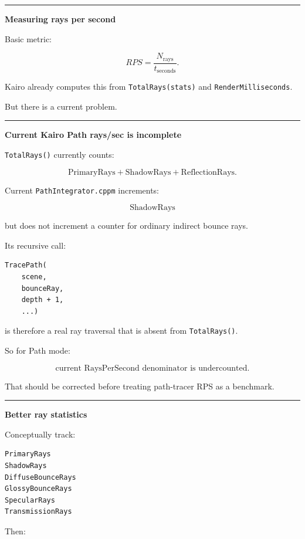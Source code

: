 \begin{center}\rule{0.5\linewidth}{0.5pt}\end{center}

\textbf{Measuring rays per second}

Basic metric:

\[
\boxed{
RPS
=
\frac{
N_{\text{rays}}
}{
t_{\text{seconds}}
}.
}
\]

Kairo already computes this from \texttt{TotalRays(stats)} and \texttt{RenderMilliseconds}.

But there is a current problem.

\begin{center}\rule{0.5\linewidth}{0.5pt}\end{center}

\textbf{Current Kairo Path rays/sec is incomplete}

\texttt{TotalRays()} currently counts:

\[
\text{PrimaryRays}
+
\text{ShadowRays}
+
\text{ReflectionRays}.
\]

Current \texttt{PathIntegrator.cppm} increments:

\[
\text{ShadowRays}
\]

but does not increment a counter for ordinary indirect bounce rays.

Its recursive call:

\begin{verbatim}
TracePath(
    scene,
    bounceRay,
    depth + 1,
    ...)
\end{verbatim}

is therefore a real ray traversal that is absent from \texttt{TotalRays()}.

So for Path mode:

\[
\boxed{
\text{current RaysPerSecond denominator is undercounted}.
}
\]

That should be corrected before treating path-tracer RPS as a benchmark.

\begin{center}\rule{0.5\linewidth}{0.5pt}\end{center}

\textbf{Better ray statistics}

Conceptually track:

\begin{verbatim}
PrimaryRays
ShadowRays
DiffuseBounceRays
GlossyBounceRays
SpecularRays
TransmissionRays
\end{verbatim}

Then:

